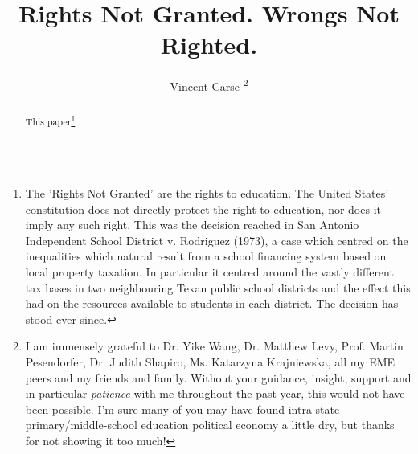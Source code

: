 \documentclass[titlepage]{article}
\begin{document}
\title{Rights Not Granted. Wrongs Not Righted.}
\author{Vincent Carse \thanks{I am immensely grateful to Dr. Yike Wang, Dr. Matthew Levy, Prof. Martin Pesendorfer, Dr. Judith Shapiro, Ms. Katarzyna Krajniewska, all my EME peers and my friends and family. Without your guidance, insight, support and in particular \textit{patience} with me throughout the past year, this would not have been possible. I'm sure many of you may have found intra-state primary/middle-school education political economy a little dry, but thanks for not showing it too much!}}
\maketitle
\begin{abstract}

This paper\footnote{The 'Rights Not Granted' are the rights to education. The United States' constitution does not directly protect the right to education, nor does it imply any such right. This was the decision reached in San Antonio Independent School District v. Rodriguez (1973), a case which centred on the inequalities which natural result from a school financing system based on local property taxation. In particular it centred around the vastly different tax bases in two neighbouring Texan public school districts and the effect this had on the resources available to students in each district. The decision has stood ever since.
}
\end{abstract}
\end{document}
